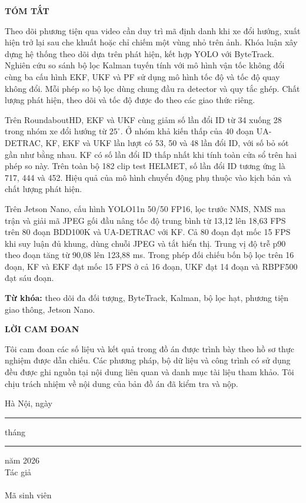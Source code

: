 \newcommand{\tieudephandau}[1]{\begin{center}\Large\bfseries #1\end{center}\vspace{.75em}}
\tieudephandau{TÓM TẮT}
Theo dõi phương tiện qua video cần duy trì mã định danh khi xe đổi hướng, xuất hiện trở lại sau che khuất hoặc chỉ chiếm một vùng nhỏ trên ảnh. Khóa luận xây dựng hệ thống theo dõi dựa trên phát hiện, kết hợp YOLO với ByteTrack. Nghiên cứu so sánh bộ lọc Kalman tuyến tính với mô hình vận tốc không đổi cùng ba cấu hình EKF, UKF và PF sử dụng mô hình tốc độ và tốc độ quay không đổi. Mỗi phép so bộ lọc dùng chung đầu ra detector và quy tắc ghép. Chất lượng phát hiện, theo dõi và tốc độ được đo theo các giao thức riêng.

Trên RoundaboutHD, EKF và UKF cùng giảm số lần đổi ID từ 34 xuống 28 trong nhóm xe đổi hướng từ $25^\circ$. Ở nhóm khả kiến thấp của 40 đoạn UA-DETRAC, KF, EKF và UKF lần lượt có 53, 50 và 48 lần đổi ID, với số bỏ sót gần như bằng nhau. KF có số lần đổi ID thấp nhất khi tính toàn cửa sổ trên hai phép so này. Trên toàn bộ 182 clip test HELMET, số lần đổi ID tương ứng là 717, 444 và 452. Hiệu quả của mô hình chuyển động phụ thuộc vào kịch bản và chất lượng phát hiện.

Trên Jetson Nano, cấu hình YOLO11n 50/50 FP16, lọc trước NMS, NMS ma trận và giải mã JPEG gối đầu nâng tốc độ trung bình từ 13,12 lên 18,63 FPS trên 80 đoạn BDD100K và UA-DETRAC với KF. Cả 80 đoạn đạt mốc 15 FPS khi suy luận đủ khung, dùng chuỗi JPEG và tắt hiển thị. Trung vị độ trễ p90 theo đoạn tăng từ 90,08 lên 123,88 ms. Trong phép đối chiếu bốn bộ lọc trên 16 đoạn, KF và EKF đạt mốc 15 FPS ở cả 16 đoạn, UKF đạt 14 đoạn và RBPF500 đạt sáu đoạn.
\par\medskip\noindent\textbf{Từ khóa:} theo dõi đa đối tượng, ByteTrack, Kalman, bộ lọc hạt, phương tiện giao thông, Jetson Nano.

\clearpage\tieudephandau{LỜI CAM ĐOAN}
Tôi cam đoan các số liệu và kết quả trong đồ án được trình bày theo hồ sơ thực nghiệm được dẫn chiếu. Các phương pháp, bộ dữ liệu và công trình có sử dụng đều được ghi nguồn tại nội dung liên quan và danh mục tài liệu tham khảo. Tôi chịu trách nhiệm về nội dung của bản đồ án đã kiểm tra và nộp.
\begin{flushright}
Hà Nội, ngày \rule{9mm}{.35pt} tháng \rule{9mm}{.35pt} năm 2026\\[5pt]
Tác giả\\[28mm]
\textbf{\SinhVien}\\
Mã sinh viên\enspace \MaSinhVien
\end{flushright}

